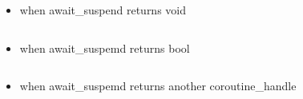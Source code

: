 \documentclass[twoside,twocolumn, 10pt]{article}
\begin{document}
	\begin{itemize}
		\item when await\_suspend returns void \\ \inputminted[firstline=2, lastline=8]{c++}{code-examples/theory-custom-coroutine/co-await-transformation-suspend.cpp}
		\item when await\_suspemd returns bool \\ \inputminted[firstline=11, lastline=19]{c++}{code-examples/theory-custom-coroutine/co-await-transformation-suspend.cpp}
		\item when await\_suspemd returns another coroutine\_handle \\ \inputminted[firstline=22, lastline=31]{c++}{code-examples/theory-custom-coroutine/co-await-transformation-suspend.cpp}
	
	\end{itemize}
\end{document}
